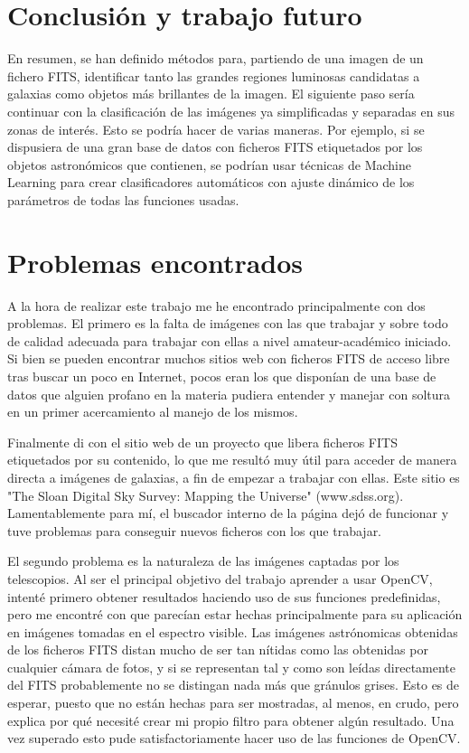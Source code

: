 \documentclass[a4paper,12pt]{article}
\begin{document}
\section{Conclusión y trabajo futuro}
En resumen, se han definido métodos para, partiendo de una imagen de un fichero FITS, identificar tanto las grandes regiones luminosas candidatas a galaxias como objetos más brillantes de la imagen. El siguiente paso sería continuar con la clasificación de las imágenes ya simplificadas y separadas en sus zonas de interés. Esto se podría hacer de varias maneras. Por ejemplo, si se dispusiera de una gran base de datos con ficheros FITS etiquetados por los objetos astronómicos que contienen, se podrían usar técnicas de Machine Learning para crear clasificadores automáticos con ajuste dinámico de los parámetros de todas las funciones usadas.



\section{Problemas encontrados}
A la hora de realizar este trabajo me he encontrado principalmente con dos problemas. El primero es la falta de imágenes con las que trabajar y sobre todo de calidad adecuada para trabajar con ellas a nivel amateur-académico iniciado. Si bien se pueden encontrar muchos sitios web con ficheros FITS de acceso libre tras buscar un poco en Internet, pocos eran los que disponían de una base de datos que alguien profano en la materia pudiera entender y manejar con soltura en un primer acercamiento al manejo de los mismos.

Finalmente di con el sitio web de un proyecto que libera ficheros FITS etiquetados por su contenido, lo que me resultó muy útil para acceder de manera directa a imágenes de galaxias, a fin de empezar a trabajar con ellas. Este sitio es "The Sloan Digital Sky Survey: Mapping the Universe" (www.sdss.org). Lamentablemente para mí, el buscador interno de la página dejó de funcionar y tuve problemas para conseguir nuevos ficheros con los que trabajar.

El segundo problema es la naturaleza de las imágenes captadas por los telescopios. Al ser el principal objetivo del trabajo aprender a usar OpenCV, intenté primero obtener resultados haciendo uso de sus funciones predefinidas, pero me encontré con que parecían estar hechas principalmente para su aplicación en imágenes tomadas en el espectro visible. Las imágenes astrónomicas obtenidas de los ficheros FITS distan mucho de ser tan nítidas como las obtenidas por cualquier cámara de fotos, y si se representan tal y como son leídas directamente del FITS probablemente no se distingan nada más que gránulos grises. Esto es de esperar, puesto que no están hechas para ser mostradas, al menos, en crudo, pero explica por qué necesité crear mi propio filtro para obtener algún resultado. Una vez superado esto pude satisfactoriamente hacer uso de las funciones de OpenCV.
\end{document}
